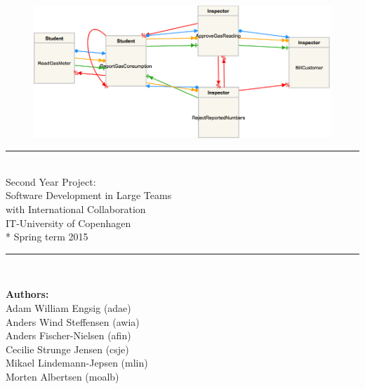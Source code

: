 \begin{titlepage}

\begin{center}
\begin{figure}
	\centering
	\includegraphics[width=1.0\linewidth]{Figures/SampleGraphForFrontpage}
\end{figure}




\rule{\textwidth}{1mm}\\
\vspace*{7mm}
\huge{
Second Year Project: \\ 
Software Development in Large Teams \\
with International Collaboration \\ 
\vspace*{8mm}
IT-University of Copenhagen \\*
Spring term 2015
}
\vspace*{7mm}

\rule{\textwidth}{1mm}\\

\vspace*{12mm}


\begin{Large}
\textbf{Authors:} \\
\vspace*{2mm}
Adam William Engsig  (adae)\\
Anders Wind Steffensen (awia) \\
Anders Fischer-Nielsen (afin) \\
Cecilie Strunge Jensen (csje) \\
Mikael Lindemann-Jepsen (mlin) \\
Morten Albertsen (moalb)
\end{Large}

\end{center}

\end{titlepage}
\newpage